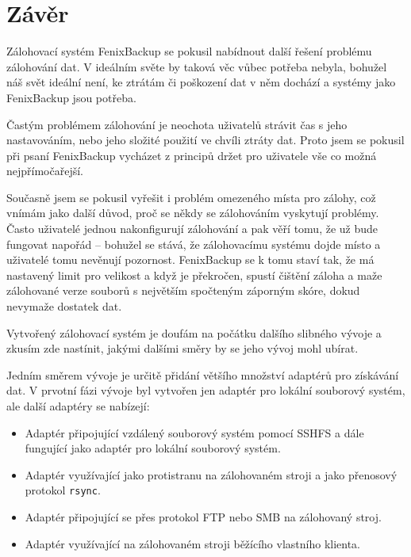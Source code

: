 \chapter*{Závěr}

Zálohovací systém FenixBackup se pokusil nabídnout další řešení problému
zálohování dat. V ideálním světe by taková věc vůbec potřeba nebyla, bohužel náš
svět ideální není, ke ztrátám či poškození dat v něm dochází a systémy jako
FenixBackup jsou potřeba.

Častým problémem zálohování je neochota uživatelů strávit čas s jeho
nastavováním, nebo jeho složité použití ve chvíli ztráty dat. Proto jsem se
pokusil při psaní FenixBackup vycházet z principů držet pro uživatele vše co
možná nejpřímočařejší.

Současně jsem se pokusil vyřešit i problém omezeného místa pro zálohy, což
vnímám jako další důvod, proč se někdy se zálohováním vyskytují problémy. Často
uživatelé jednou nakonfigurují zálohování a pak věří tomu, že už bude fungovat
napořád -- bohužel se stává, že zálohovacímu systému dojde místo a uživatelé
tomu nevěnují pozornost. FenixBackup se k tomu staví tak, že má nastavený limit
pro velikost a když je překročen, spustí čištění záloha a maže zálohované verze
souborů s největším spočteným záporným skóre, dokud nevymaže dostatek dat.

Vytvořený zálohovací systém je doufám na počátku dalšího slibného vývoje a zkusím
zde nastínit, jakými dalšími směry by se jeho vývoj mohl ubírat.


Jedním směrem vývoje je určitě přidání většího množství adaptérů pro získávání
dat. V prvotní fázi vývoje byl vytvořen jen adaptér pro lokální souborový
systém, ale další adaptéry se nabízejí:
\begin{itemize}
	\item Adaptér připojující vzdálený souborový systém pomocí \gls{SSHFS}
	a dále fungující jako adaptér pro lokální souborový systém.
	\item Adaptér využívající jako protistranu na zálohovaném stroji a jako
	přenosový protokol \texttt{rsync}.
	\item Adaptér připojující se přes protokol \gls{FTP} nebo \gls{SMB} na
	zálohovaný stroj.
	\item Adaptér využívající na zálohovaném stroji běžícího vlastního
	klienta.
\end{itemize}

